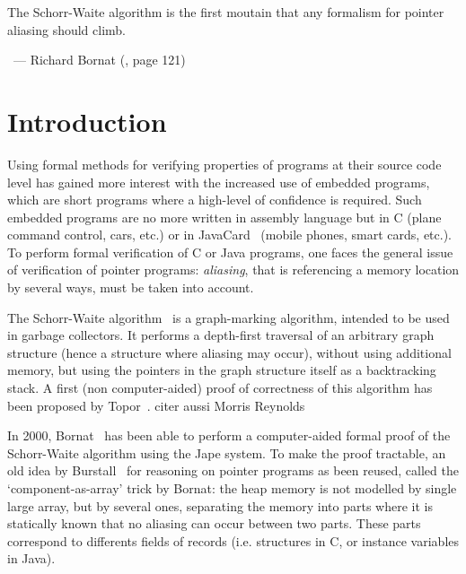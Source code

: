 


\hfill\begin{minipage}{0.5\textwidth}
\begin{slshape}
The Schorr-Waite algorithm is the first moutain that any formalism for
pointer aliasing should climb.
\end{slshape}

~\hfill --- Richard Bornat (\cite{bornat00mpc}, page 121)
\end{minipage}

\section{Introduction}

Using formal methods for verifying properties of programs at their
source code level has gained more interest with the increased use of
embedded programs, which are short programs where a high-level of
confidence is required. Such embedded programs are no more written in
assembly language but in C (plane command control, cars, etc.) or in
JavaCard~\cite{JavaCard} (mobile phones, smart cards, etc.).  To
perform formal verification of C or Java programs, one faces the
general issue of verification of pointer programs: \emph{aliasing},
that is referencing a memory location by several ways, must be taken
into account. 

The Schorr-Waite algorithm~\cite{schorr67cacm} is a graph-marking
algorithm, intended to be used in garbage collectors. It performs a
depth-first traversal of an arbitrary graph structure (hence a
structure where aliasing may occur), without using additional memory,
but using the pointers in the graph structure itself as a backtracking
stack. A first (non computer-aided) proof of correctness of this
algorithm has been proposed by Topor~\cite{topor79acta}. {\huge citer
  aussi Morris \cite{morris82} Reynolds }

In 2000, Bornat~\cite{bornat00mpc} has been able to perform a
computer-aided formal proof of the Schorr-Waite algorithm using the
Jape system. To make the proof tractable, an old idea by
Burstall~\cite{burstall72} for reasoning on pointer programs as been
reused, called the `component-as-array' trick by Bornat: the heap
memory is not modelled by single large array, but by several ones,
separating the memory into parts where it is statically known that no
aliasing can occur between two parts. These parts correspond to
differents fields of records (i.e. structures in C, or instance
variables in Java).

